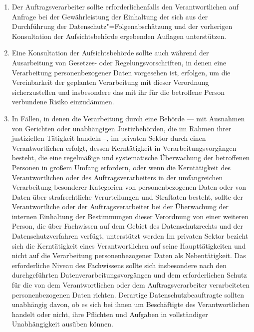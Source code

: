 \begin{enumerate}

   \item Der Auftragsverarbeiter sollte erforderlichenfalls den Verantwortlichen auf Anfrage bei der Gewährleistung der
    Einhaltung der sich aus der Durchführung der Datenschutz"=Folgenabschätzung und der vorherigen Konsultation der
    Aufsichtsbehörde ergebenden Auflagen unterstützen.%
   \label{itm:eg-95}
   

   \item Eine Konsultation der Aufsichtsbehörde sollte auch während der Ausarbeitung von Gesetzes- oder
    Regelungsvorschriften, in denen eine Verarbeitung personenbezogener Daten vorgesehen ist, erfolgen, um die
    Vereinbarkeit der geplanten Verarbeitung mit dieser Verordnung sicherzustellen und insbesondere das mit ihr für die
    betroffene Person verbundene Risiko einzudämmen.%
   \label{itm:eg-96}
   

   \item In Fällen, in denen die Verarbeitung durch eine Behörde — mit Ausnahmen von Gerichten oder unabhängigen
    Justizbehörden, die im Rahmen ihrer justiziellen Tätigkeit handeln –, im privaten Sektor durch einen
    Verantwortlichen erfolgt, dessen Kerntätigkeit in Verarbeitungsvorgängen besteht, die eine regelmäßige und
    systematische Überwachung der betroffenen Personen in großem Umfang erfordern, oder wenn die Kerntätigkeit des
    Verantwortlichen oder des Auftragsverarbeiters in der umfangreichen Verarbeitung besonderer Kategorien von
    personenbezogenen Daten oder von Daten über strafrechtliche Verurteilungen und Straftaten besteht, sollte der
    Verantwortliche oder der Auftragsverarbeiter bei der Überwachung der internen Einhaltung der Bestimmungen dieser
    Verordnung von einer weiteren Person, die über Fachwissen auf dem Gebiet des Datenschutzrechts und der
    Datenschutzverfahren verfügt, unterstützt werden Im privaten Sektor bezieht sich die Kerntätigkeit eines
    Verantwortlichen auf seine Haupttätigkeiten und nicht auf die Verarbeitung personenbezogener Daten als
    Nebentätigkeit. Das erforderliche Niveau des Fachwissens sollte sich insbesondere nach den durchgeführten
    Datenverarbeitungsvorgängen und dem erforderlichen Schutz für die von dem Verantwortlichen oder dem
    Auftragsverarbeiter verarbeiteten personenbezogenen Daten richten. Derartige Datenschutzbeauftragte sollten
    unabhängig davon, ob es sich bei ihnen um Beschäftigte des Verantwortlichen handelt oder nicht, ihre Pflichten und
    Aufgaben in vollständiger Unabhängigkeit ausüben können.%
   \label{itm:eg-97}
   

\end{enumerate}
